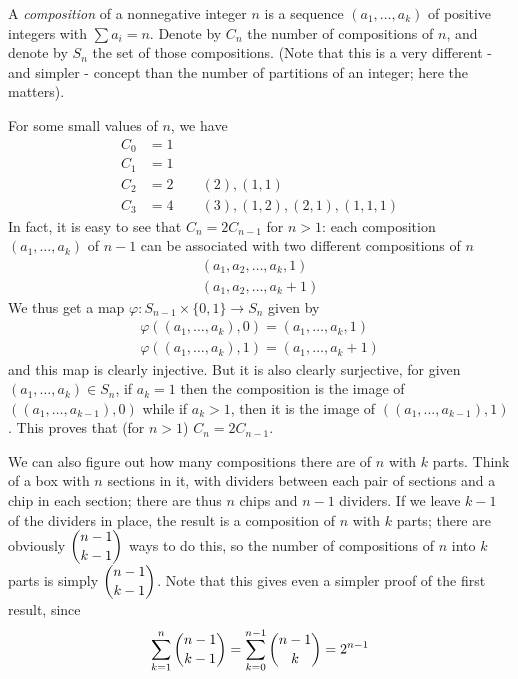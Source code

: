 \documentclass[12pt]{article}
\begin{document}
A \emph{composition} of a nonnegative integer $n$ is a sequence $(a_1,\ldots,a_k)$ of positive integers with $\sum a_i=n$. Denote by $C_n$ the number of compositions of $n$, and denote by $S_n$ the set of those compositions. (Note that this is a very different - and simpler - concept than the number of partitions of an integer; here the  matters).

For some small values of $n$, we have
\begin{align*}
C_0&=1\\
C_1 &= 1\\
C_2 &= 2 \qquad (2), (1,1)\\
C_3 &= 4 \qquad (3), (1,2), (2,1), (1,1,1)
\end{align*}
In fact, it is easy to see that $C_n=2C_{n-1}$ for $n>1$: each composition $(a_1,\ldots,a_k)$ of $n-1$ can be associated with two different compositions of $n$
\begin{gather*}
(a_1,a_2,\ldots,a_k,1)\\
(a_1,a_2,\ldots,a_k+1)
\end{gather*}
We thus get a map $\varphi:S_{n-1}\times\{0,1\}\to S_n$ given by
\begin{gather*}
\varphi((a_1,\ldots,a_k),0)=(a_1,\ldots,a_k,1)\\
\varphi((a_1,\ldots,a_k),1)=(a_1,\ldots,a_k+1)
\end{gather*}
and this map is clearly injective. But it is also clearly surjective, for given $(a_1,\ldots,a_k)\in S_n$, if $a_k=1$ then the composition is the image of $((a_1,\ldots,a_{k-1}),0)$ while if $a_k>1$, then it is the image of $((a_1,\ldots,a_{k-1}),1)$. This proves that (for $n>1$) $C_n = 2C_{n-1}$.

We can also figure out how many compositions there are of $n$ with $k$ parts. Think of a box with $n$ sections in it, with dividers between each pair of sections and a chip in each section; there are thus $n$ chips and $n-1$ dividers. If we leave $k-1$ of the dividers in place, the result is a composition of $n$ with $k$ parts; there are obviously $\dbinom{n-1}{k-1}$ ways to do this, so the number of compositions of $n$ into $k$ parts is simply $\dbinom{n-1}{k-1}$. Note that this gives even a simpler proof of the first result, since
\[\sum_{k=1}^n\dbinom{n-1}{k-1} = \sum_{k=0}^{n-1}\dbinom{n-1}{k}=2^{n-1}\]
\end{document}
